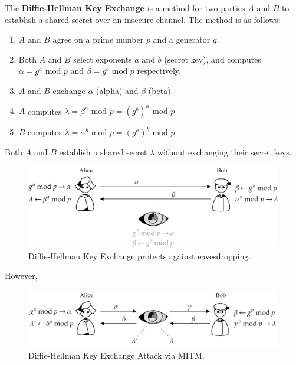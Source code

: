 \begin{Def}
    \label{def:dh}
    The \textbf{Diffie-Hellman Key Exchange} is a method for two parties $A$ and $B$ to establish a shared secret over an insecure channel.
    The method is as follows:
    \begin{enumerate}
        \item $A$ and $B$ agree on a prime number $p$ and a generator $g$.
        \item Both $A$ and $B$ select exponents $a$ and $b$ (secret key), and computes $\alpha=g^a \text{ mod } p$ and $\beta =g^b \text{ mod } p$ respectively.
        \item $A$ and $B$ exchange $\alpha$ (alpha) and $\beta$ (beta).
        \item $A$ computes $\lambda = \beta^a \text{ mod } p= (g^b)^a \text{ mod } p$.
        \item $B$ computes $\lambda = \alpha^b \text{ mod } p= (g^a)^b \text{ mod } p$.
    \end{enumerate}
    \noindent
    Both $A$ and $B$ establish a shared secret $\lambda$ without exchanging their secret keys. \hfill \cite{goldberg_cs357}
\end{Def}

\begin{figure}[h!]
    \centering
    \includegraphics[width=.9\textwidth]{Sections/sec/enc/dh/dh.png}
    \caption{Diffie-Hellman Key Exchange protects against eavesdropping.}
    \label{fig:dh}
\end{figure}

\noindent
However,
\begin{figure}[h!]
    \centering
    \includegraphics[width=.9\textwidth]{Sections/sec/enc/dh/mitm.png}
    \caption{Diffie-Hellman Key Exchange Attack via MITM.}
    \label{fig:dh}
\end{figure}

